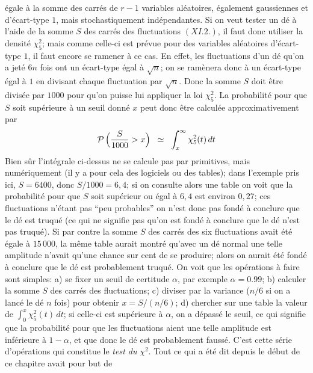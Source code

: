 \'egale \`a la somme des carr\'es de $r-1$ variables al\'eatoires,
\'egalement gaussiennes et d'\'ecart-type $1$, mais stochastiquement
ind\'ependantes. 
\medskip
Si on veut tester un d\'e \`a l'aide de la somme $S$ des carr\'es des
fluctuations $(XI.2.)$, il faut donc utiliser la densit\'e $\chi_{5}^2$; 
mais comme celle-ci est pr\'evue pour des variables al\'eatoires 
d'\'ecart-type $1$, il faut encore se ramener \`a ce cas. En effet, les
fluctuations d'un d\'e qu'on a jet\'e $6n$ fois ont un \'ecart-type \'egal 
\`a $\sqrt{n}$; on se ram\`enera donc \`a un \'ecart-type \'egal \`a $1$ en 
divisant chaque fluctuation par $\sqrt{n}$.  Donc la somme $S$ doit \^etre
divis\'ee par $1000$ pour qu'on puisse lui appliquer la loi $\chi_{5}^2$.
La probabilit\'e pour que $S$ soit sup\'erieure \`a un seuil donn\'e $x$ 
peut donc \^etre calcul\'ee approximativement par
$${\cal P}\, \Bigl( {S \over 1000} > x \Bigr) \;\; \simeq \;\; 
\int_x^\infty
\chi_5^2 (t) \, dt$$
Bien s\^ur l'int\'egrale ci-dessus ne se calcule pas par primitives, mais
nu\-m\'e\-ri\-que\-ment (il y a pour cela des logiciels ou des tables); dans 
l'exemple pris ici, $S = 6400$, donc $S/1000 = 6,4$; si on consulte alors
une table on voit que la probabilit\'e pour que $S$ soit sup\'erieur ou 
\'egal \`a $6,4$ est environ $0,27$; ces fluctuations n'\'etant pas ``peu
probables'' on n'est donc pas fond\'e \`a conclure que le d\'e est truqu\'e 
(ce qui ne signifie pas qu'on est fond\'e \`a conclure que le d\'e n'est pas
truqu\'e). Si par contre la somme $S$ des carr\'es des six fluctuations
avait \'et\'e \'egale \`a $15\, 000$, la m\^eme table aurait montr\'e
qu'avec un d\'e normal une telle amplitude n'avait qu'une chance sur cent 
de se produire; alors on aurait \'et\'e fond\'e \`a conclure que le d\'e est 
probablement truqu\'e. 
\medskip
On voit que les op\'erations \`a faire sont simples:
\smallskip
a) se fixer un seuil de certitude $\alpha$, par exemple $\alpha = 0.99$;
\smallskip
b) calculer la somme $S$ des carr\'es des fluctuations;
\smallskip
c) diviser par la variance ($n/6$ si on a lanc\'e le d\'e $n$ fois) pour 
obtenir $x = S \bigl/ (n/6)$; 
\smallskip
d) chercher sur une table la valeur de $\int_0^x\chi_5^2 (t)\, dt$;  si
celle-ci est sup\'erieure \`a $\alpha$, on a d\'epass\'e le seuil, ce qui 
signifie que la probabilit\'e pour que les fluctuations aient une telle
amplitude est inf\'erieure \`a $1-\alpha$, et que donc le d\'e est
probablement fauss\'e. 
\medskip
C'est cette s\'erie d'op\'erations qui constitue le {\it test du} $\chi^2$.
\medskip
Tout ce qui a \'et\'e dit depuis le d\'ebut de ce chapitre avait pour but de
